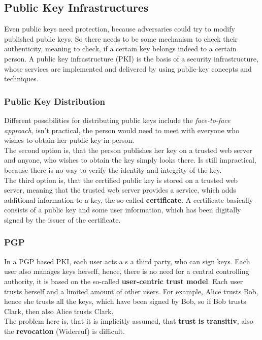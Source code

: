 \documentclass[a4paper, 10 pt, conference]{ieeeconf}
\begin{document}
\subsection{\textbf{Public Key Infrastructures}}
Even public keys need protection, because adversaries could try to modify published public keys. 
So there needs to be some mechanism to check their authenticity, meaning to check, if a certain key belongs indeed to a certain person. 
A public key infrastructure (PKI) is the basis of a security infrastructure, whose services are implemented and delivered by using public-key concepts and techniques. 
\vspace{0.5cm}
\subsubsection{\textbf{Public Key Distribution}}
Different possibilities for distributing public keys include the \emph{face-to-face approach}, isn't practical, the person would need to meet with everyone who wishes to obtain her public key in person. \\
The second option is, that the person publishes her key on a trusted web server and anyone, who wishes to obtain the key simply looks there. Is still impractical, because there is no way to verify the identity and integrity of the key. \\
The third option is, that the certified public key is stored on a trusted web server, meaning that the trusted web server provides a service, which adds additional information to a key, the so-called \textbf{certificate}.
A certificate basically consists of a public key and some user information, which has been digitally signed by the issuer of the certificate. 
\vspace{0.5cm}
\subsubsection{\textbf{PGP}}
In a PGP based PKI, each user acts a s a third party, who can sign keys. Each user also manages keys herself, hence, there is no need for a central controlling authority, it is based on the so-called \textbf{user-centric trust model}. Each user trusts herself and a limited amount of other users. 
For example, Alice trusts Bob, hence she trusts all the keys, which have been signed by Bob, so if Bob trusts Clark, then also Alice trusts Clark. \\
The problem here is, that it is implicitly assumed, that \textbf{trust is transitiv}, also the \textbf{revocation} (Widerruf) is difficult. 
\vspace{0.5cm}
\end{document}
